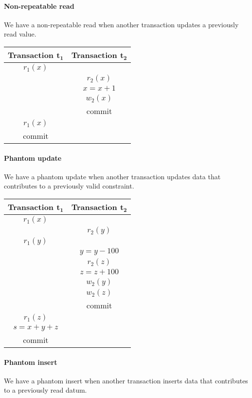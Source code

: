 \paragraph*{Non-repeatable read}
We have a non-repeatable read when another transaction updates a previously read value.
\begin{table}[H]
    \centering
    \begin{tabular}{c|c}
    \textbf{Transaction $\boldsymbol{t_1}$}  & \textbf{Transaction $\boldsymbol{t_2}$} \\ \hline
    $r_1(x)$                    &                            \\
                                & $r_2(x)$                   \\
                                & $x=x+1$                    \\
                                & $w_2(x)$                   \\
                                & commit                     \\
    $r_1(x)$                    &                            \\
    commit                      & \multicolumn{1}{l}{}      
    \end{tabular}
\end{table}

\paragraph*{Phantom update}
We have a phantom update when another transaction updates data that contributes to a previously valid constraint.
\begin{table}[H]
    \centering
    \begin{tabular}{c|c}
    \textbf{Transaction $\boldsymbol{t_1}$} & \textbf{Transaction $\boldsymbol{t_2}$} \\ \hline
    $r_1(x)$                    &                            \\
                                & $r_2(y)$                   \\
    $r_1(y)$                    &                            \\
                                & $y=y-100$                  \\
                                & $r_2(z)$                   \\
                                & $z=z+100$                  \\
                                & $w_2(y)$                   \\
                                & $w_2(z)$                   \\
                                & commit                     \\
    $r_1(z)$                    &                            \\
    $s=x+y+z$                   &                            \\
    commit                      &                           
    \end{tabular}
\end{table}

\paragraph*{Phantom insert}
We have a phantom insert when another transaction inserts data that contributes to a previously read datum.